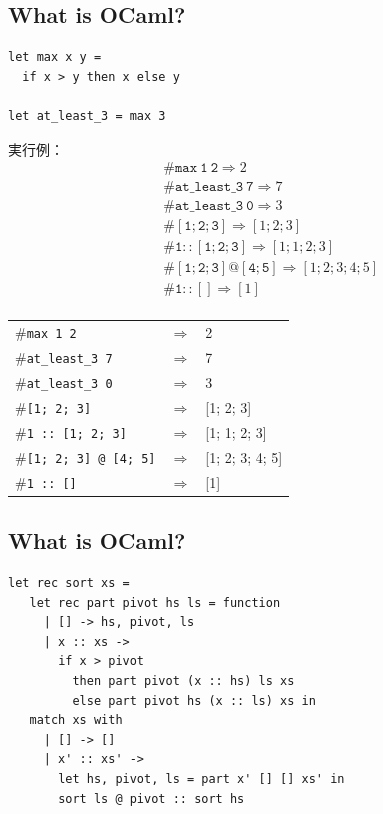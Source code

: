 \documentclass[papersize,30pt,slide]{jsarticle}
\begin{document}
\newpage
\subsection{What is OCaml?}
\begin{lstlisting}
let max x y =
  if x > y then x else y

let at_least_3 = max 3
\end{lstlisting}
{
実行例：\vspace{-20pt}
\begin{eqnarray*}
&&\mathtt{\# max~1~2} \Longrightarrow 2\\
&&\mathtt{\# at\_least\_3~7} \Longrightarrow 7\\
&&\mathtt{\# at\_least\_3~0} \Longrightarrow 3\\
&&\mathtt{\# [1; 2; 3]} \Longrightarrow [1; 2; 3]\\
&&\mathtt{\# 1 :: [1; 2; 3]} \Longrightarrow [1; 1; 2; 3]\\
&&\mathtt{\# [1; 2; 3] @ [4; 5]} \Longrightarrow [1; 2; 3; 4; 5]\\
&&\mathtt{\# 1 :: []} \Longrightarrow [1]\\
\end{eqnarray*}

\begin{tabular}{lcl}
\#\lstinline|max 1 2| &$\Longrightarrow$& 2\\
\#\lstinline|at_least_3 7| &$\Longrightarrow$& 7\\
\#\lstinline|at_least_3 0| &$\Longrightarrow$& 3\\
\#\lstinline|[1; 2; 3]| &$\Longrightarrow$& [1; 2; 3]\\
\#\lstinline|1 :: [1; 2; 3]| &$\Longrightarrow$& [1; 1; 2; 3]\\
\#\lstinline|[1; 2; 3] @ [4; 5]| &$\Longrightarrow$& [1; 2; 3; 4; 5]\\
\#\lstinline|1 :: []| &$\Longrightarrow$& [1]\\
\end{tabular}

\newpage
}
\subsection*{\thesubsection\quad What is OCaml?}
\begin{lstlisting}
let rec sort xs =
   let rec part pivot hs ls = function
     | [] -> hs, pivot, ls
     | x :: xs ->
       if x > pivot
         then part pivot (x :: hs) ls xs
         else part pivot hs (x :: ls) xs in
   match xs with
     | [] -> []
     | x' :: xs' ->
       let hs, pivot, ls = part x' [] [] xs' in
       sort ls @ pivot :: sort hs
\end{lstlisting}
\end{document}
